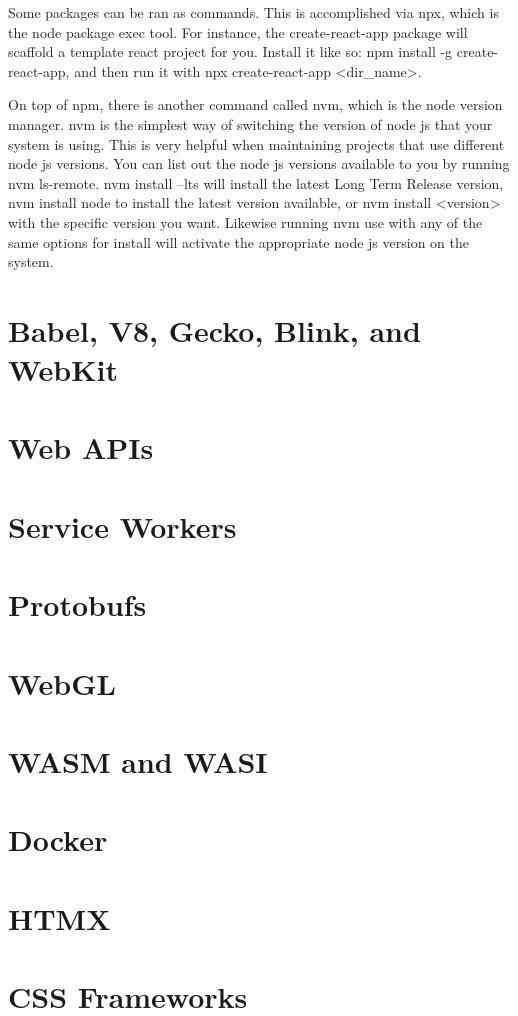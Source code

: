 \documentclass{article}
\begin{document}
Some packages can be ran as commands. This is accomplished via npx, which is the node package exec tool. For 
instance, the create-react-app package will scaffold a template react project for you. Install it like so:
npm install -g create-react-app, and then run it with npx create-react-app <dir_name>. 

On top of npm, there is another command called nvm, which is the node version manager. nvm is the simplest 
way of switching the version of node js that your system is using. This is very helpful when maintaining 
projects that use different node js versions. You can list out the node js versions available to you by 
running nvm ls-remote. nvm install --lts will install the latest Long Term Release version, nvm install node 
to install the latest version available, or nvm install <version> with the specific version you want. Likewise 
running nvm use with any of the same options for install will activate the appropriate node js version on the 
system. 

\section{Babel, V8, Gecko, Blink, and WebKit}

\section{Web APIs}

\section{Service Workers}

\section{Protobufs}

\section{WebGL}

\section{WASM and WASI}

\section{Docker}

\section{HTMX}

\section{CSS Frameworks}
\end{document}
